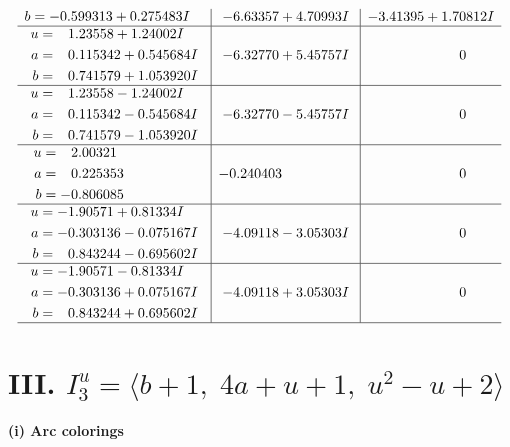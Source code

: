 \documentclass[1p]{elsarticle_modified}
\theoremstyle{definition}
\begin{document}
$$\begin{array}{c|c|c}
\begin{aligned}
b &= -0.599313 + 0.275483 I\end{aligned}
 & -6.63357 + 4.70993 I & -3.41395 + 1.70812 I \\ \hline\begin{aligned}
u &= \phantom{-}1.23558 + 1.24002 I \\
a &= \phantom{-}0.115342 + 0.545684 I \\
b &= \phantom{-}0.741579 + 1.053920 I\end{aligned}
 & -6.32770 + 5.45757 I & \phantom{-0.000000 } 0 \\ \hline\begin{aligned}
u &= \phantom{-}1.23558 - 1.24002 I \\
a &= \phantom{-}0.115342 - 0.545684 I \\
b &= \phantom{-}0.741579 - 1.053920 I\end{aligned}
 & -6.32770 - 5.45757 I & \phantom{-0.000000 } 0 \\ \hline\begin{aligned}
u &= \phantom{-}2.00321\phantom{ +0.000000I} \\
a &= \phantom{-}0.225353\phantom{ +0.000000I} \\
b &= -0.806085\phantom{ +0.000000I}\end{aligned}
 & -0.240403\phantom{ +0.000000I} & \phantom{-0.000000 } 0 \\ \hline\begin{aligned}
u &= -1.90571 + 0.81334 I \\
a &= -0.303136 - 0.075167 I \\
b &= \phantom{-}0.843244 - 0.695602 I\end{aligned}
 & -4.09118 - 3.05303 I & \phantom{-0.000000 } 0 \\ \hline\begin{aligned}
u &= -1.90571 - 0.81334 I \\
a &= -0.303136 + 0.075167 I \\
b &= \phantom{-}0.843244 + 0.695602 I\end{aligned}
 & -4.09118 + 3.05303 I & \phantom{-0.000000 } 0\\
 \hline 
 \end{array}$$\newpage\newpage\renewcommand{\arraystretch}{1}
\centering \section*{III. $I^u_{3}= \langle b+1,\;4 a+u+1,\;u^2- u+2 \rangle$}
\flushleft \textbf{(i) Arc colorings}\\
\end{document}
